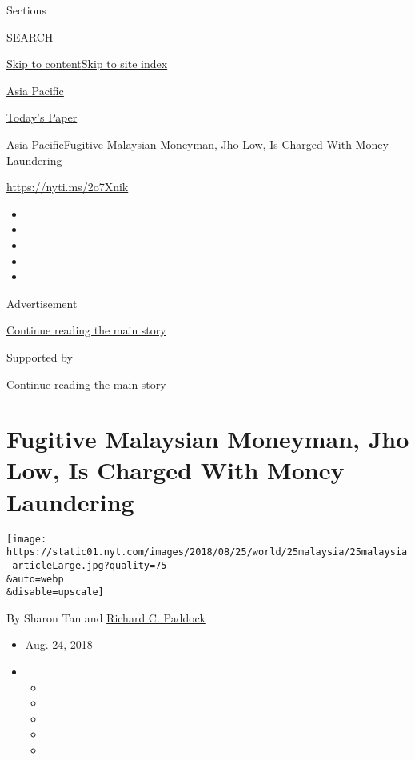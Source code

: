Sections

SEARCH

\protect\hyperlink{site-content}{Skip to
content}\protect\hyperlink{site-index}{Skip to site index}

\href{https://www.nytimes.com/section/world/asia}{Asia Pacific}

\href{https://myaccount.nytimes.com/auth/login?response_type=cookie\&client_id=vi}{}

\href{https://www.nytimes.com/section/todayspaper}{Today's Paper}

\href{/section/world/asia}{Asia Pacific}\textbar{}Fugitive Malaysian
Moneyman, Jho Low, Is Charged With Money Laundering

\url{https://nyti.ms/2o7Xnik}

\begin{itemize}
\item
\item
\item
\item
\item
\end{itemize}

Advertisement

\protect\hyperlink{after-top}{Continue reading the main story}

Supported by

\protect\hyperlink{after-sponsor}{Continue reading the main story}

\hypertarget{fugitive-malaysian-moneyman-jho-low-is-charged-with-money-laundering}{%
\section{Fugitive Malaysian Moneyman, Jho Low, Is Charged With Money
Laundering}\label{fugitive-malaysian-moneyman-jho-low-is-charged-with-money-laundering}}

\texttt{[image: https://static01.nyt.com/images/2018/08/25/world/25malaysia/25malaysia-articleLarge.jpg?quality=75\\\&auto=webp\\\&disable=upscale]}

By Sharon Tan and
\href{https://www.nytimes.com/by/richard-c-paddock}{Richard C. Paddock}

\begin{itemize}
\item
  Aug. 24, 2018
\item
  \begin{itemize}
  \item
  \item
  \item
  \item
  \item
  \end{itemize}
\end{itemize}

